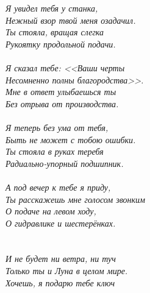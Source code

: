 \vspace{1.0cm}
\noindent\textit{%
\hspace*{2.7cm}Я увидел тебя у станка,\\
\hspace*{2.7cm}Нежный взор твой меня озадачил.\\
\hspace*{2.7cm}Ты стояла, вращая слегка\\
\hspace*{2.7cm}Рукоятку продольной подачи.\\
\\
\hspace*{2.7cm}Я сказал тебе: <<Ваши черты\\
\hspace*{2.7cm}Несомненно полны благородства>>.\\
\hspace*{2.7cm}Мне в ответ улыбаешься ты\\
\hspace*{2.7cm}Без отрыва от производства.\\
\\
\hspace*{2.7cm}Я теперь без ума от тебя,\\
\hspace*{2.7cm}Быть не может с тобою ошибки.\\
\hspace*{2.7cm}Ты стояла в руках теребя\\
\hspace*{2.7cm}Радиально-упорный подшипник.\\
\\
\hspace*{2.7cm}А под вечер к тебе я приду,\\
\hspace*{2.7cm}Ты расскажешь мне голосом звонким\\
\hspace*{2.7cm}О подаче на левом ходу,\\
\hspace*{2.7cm}О гидравлике и шестерёнках.\\
\\
\\
\hspace*{2.7cm}И не будет ни ветра, ни туч\mdash\\
\hspace*{2.7cm}Только ты и Луна в целом мире.\\
\hspace*{2.7cm}Хочешь, я подарю тебе ключ\\
}
